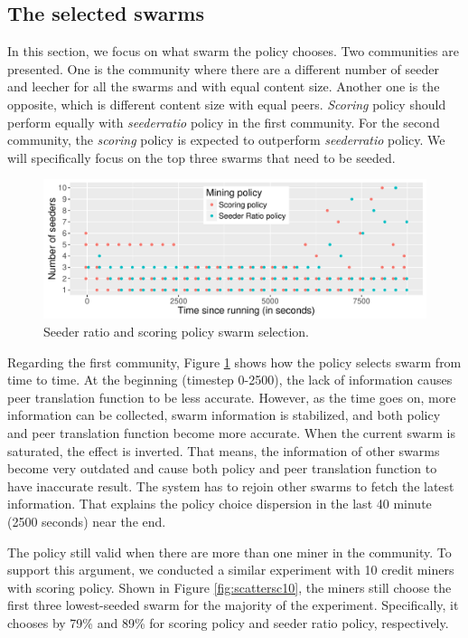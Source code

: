 \subsection{The selected swarms}
\label{section:chooseswarmexp}

In this section, we focus on what swarm the policy chooses. Two communities are presented. One is the community where there are a different number of seeder and leecher for all the swarms and with equal content size. Another one is the opposite, which is different content size with equal peers. \textit{Scoring} policy should perform equally with \textit{seederratio} policy in the first community. For the second community, the \textit{scoring} policy is expected to outperform \textit{seederratio} policy. We will specifically focus on the top three swarms that need to be seeded.

\begin{figure}[b]
	\centering
	\includegraphics[width=\textwidth]{pics/results/scsr_notrig_scatter.pdf}
	\caption{Seeder ratio and scoring policy swarm selection.}
	\label{fig:scatterscsrnotrig}
\end{figure}

Regarding the first community, Figure \ref{fig:scatterscsrnotrig} shows how the policy selects swarm from time to time. At the beginning (timestep 0-2500), the lack of information causes peer translation function to be less accurate. However, as the time goes on, more information can be collected, swarm information is stabilized, and both policy and peer translation function become more accurate. When the current swarm is saturated, the effect is inverted. That means, the information of other swarms become very outdated and cause both policy and peer translation function to have inaccurate result. The system has to rejoin other swarms to fetch the latest information. That explains the policy choice dispersion in the last 40 minute (2500 seconds) near the end. 

The policy still valid when there are more than one miner in the community. To support this argument, we conducted a similar experiment with 10 credit miners with scoring policy. Shown in Figure \ref{fig:scattersc10}, the miners still choose the first three lowest-seeded swarm for the majority of the experiment. Specifically, it chooses by 79\% and 89\% for scoring policy and seeder ratio policy, respectively. 

